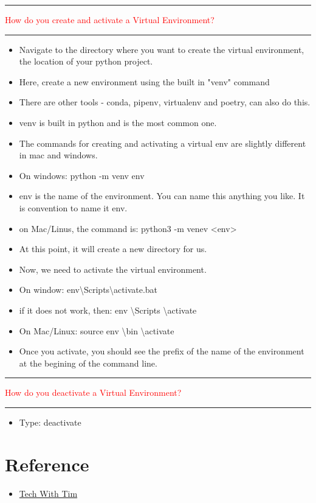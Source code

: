 \documentclass{article}
\begin{document}
\noindent
{\color{red} \rule{\linewidth}{0.5mm}}
\textcolor{red}{How do you create and activate a Virtual Environment?} \\
\noindent
{\color{red} \rule{\linewidth}{0.5mm}}
\begin{itemize}
    \item Navigate to the directory where you want to create the virtual environment, the location of your python project.
    \item Here, create a new environment using the built in "venv" command
    \item There are other tools - conda, pipenv, virtualenv and poetry, can also do this.
    \item venv is built in python and is the most common one.
    \item The commands for creating and activating a virtual env are slightly different in mac and windows.
    \item On windows: python -m venv env
    \item \textlangle env \textrangle is the name of the environment. You can name this anything you like. It is convention to name it env.
    \item on Mac/Linus, the command is: python3 -m venev <env>
    \item At this point, it will create a new directory for us.
    \item Now, we need to activate the virtual environment.
    \item On window: \textlangle env\textrangle \textbackslash Scripts\textbackslash activate.bat
    \item if it does not work, then: \textlangle env \textrangle \textbackslash Scripts \textbackslash activate
    \item On Mac/Linux: source \textlangle env \textrangle \textbackslash bin \textbackslash activate
    \item Once you activate, you should see the prefix of the name of the environment at the begining of the command line.
\end{itemize}
\noindent
{\color{red} \rule{\linewidth}{0.5mm}}
\textcolor{red}{How do you deactivate a Virtual Environment?} \\
\noindent
{\color{red} \rule{\linewidth}{0.5mm}}
\begin{itemize}
    \item Type: deactivate
\end{itemize}
\section{Reference}
\begin{itemize}
    \item \href{https://www.youtube.com/watch?v=Y21OR1OPC9As}{Tech With Tim}
\end{itemize}
\end{document}
